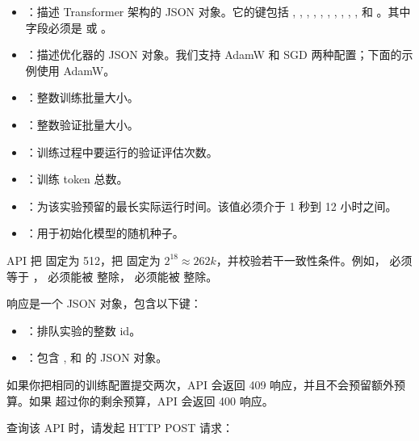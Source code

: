 \begin{itemize}
  \item {}：描述 Transformer 架构的 JSON 对象。{\small 它的键包括 , , , , , , , , , ,  和 。}其中  字段必须是  或 。
  \item {}：描述优化器的 JSON 对象。我们支持 AdamW 和 SGD 两种配置；下面的示例使用 AdamW。
  \item {}：整数训练批量大小。
  \item {}：整数验证批量大小。
  \item {}：训练过程中要运行的验证评估次数。
  \item {}：训练 token 总数。
  \item {}：为该实验预留的最长实际运行时间。该值必须介于 1 秒到 12 小时之间。
  \item {}：用于初始化模型的随机种子。
\end{itemize}

API 把  固定为 512，把  固定为 $2^{18} \approx 262k$，并校验若干一致性条件。例如， 必须等于 ， 必须能被  整除， 必须能被  整除。

响应是一个 JSON 对象，包含以下键：

\begin{itemize}
  \item {}：排队实验的整数 id。
  \item {}：{\small 包含 ,  和  的 JSON 对象。}
\end{itemize}

如果你把相同的训练配置提交两次，API 会返回 409 响应，并且不会预留额外预算。如果  超过你的剩余预算，API 会返回 400 响应。

查询该 API 时，请发起 HTTP POST 请求：


